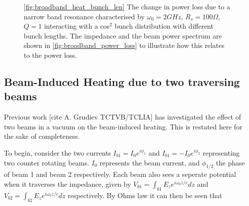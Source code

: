 \documentclass[12pt,a4paper,twopage,openright]{report}
\begin{document}
\begin{figure}
\caption{\ref{fig:broadband_heat_bunch_len} The change in power loss due to a narrow band resonance characterised by $\omega_{0} = 2GHz$, $R_{s} = 100\Omega$, $Q = 1$ interacting with a cos$^{2}$ bunch distribution with different bunch lengths. The impedance and the beam power spectrum are shown in \ref{fig:broadband_power_loss} to illustrate how this relates to the power loss.}
\end{figure}

\subsection{Beam-Induced Heating due to two traversing beams}

Previous work [cite A. Grudiev TCTVB/TCLIA] has investigated the effect of two beams in a vacuum on the beam-induced heating. This is restated here for the sake of completeness.

To begin, consider the two currents $I_{b1} = I_{0}e^{i\phi_{1}}$ and $I_{b1} = -I_{0}e^{i\phi_{2}}$ representing two counter rotating beams. $I_{0}$ represents the beam current, and $\phi_{1/2}$ the phase of beam 1 and beam 2 respectively. Each beam also sees a seperate potential when it traverses the impedance, given by $V_{b1} = \int_{b1} E_{z} e^{i\omega_{0}z/c} dz$ and $V_{b2} = \int_{b2} E_{z} e^{i\omega_{0}z/c} dz$ respectively. By Ohms law it can then be seen that
\end{document}
